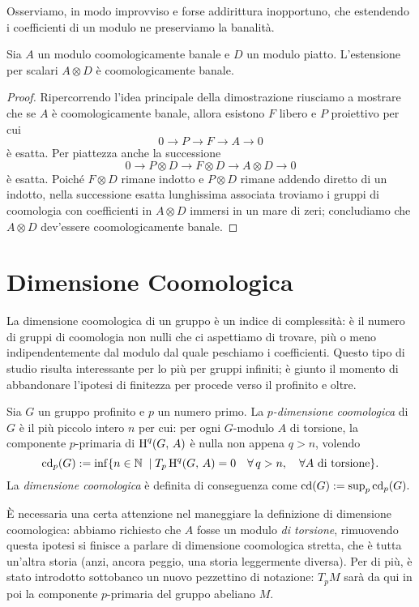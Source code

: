 Osserviamo, in modo improvviso e forse addirittura inopportuno, che estendendo i coefficienti di un modulo ne preserviamo la banalità.

\begin{corollary}\label{tensor magic}
	Sia $ A $ un modulo coomologicamente banale e $ D $ un modulo piatto. L'estensione per scalari $ A \otimes D $ è coomologicamente banale.
\end{corollary}
\begin{proof}
	Ripercorrendo l'idea principale della dimostrazione riusciamo a mostrare che se $ A $ è coomologicamente banale, allora esistono $ F $ libero e $ P $ proiettivo per cui
	\[ 0 \to P \to F \to A \to 0 \]
	è esatta. Per piattezza anche la successione
	\[ 0 \to P \otimes D \to F\otimes D \to A\otimes D \to 0 \]
	è esatta. Poiché $ F \otimes D $ rimane indotto e $ P \otimes D $ rimane addendo diretto di un indotto, nella successione esatta lunghissima associata troviamo i gruppi di coomologia con coefficienti in $ A \otimes D $ immersi in un mare di zeri; concludiamo che $ A \otimes D $ dev'essere coomologicamente banale.
\end{proof}

\section{Dimensione Coomologica}
La dimensione coomologica di un gruppo è un indice di complessità: è il numero di gruppi di coomologia non nulli che ci aspettiamo di trovare, più o meno indipendentemente dal modulo dal quale peschiamo i coefficienti. Questo tipo di studio risulta interessante per lo più per gruppi infiniti; è giunto il momento di abbandonare l'ipotesi di finitezza per procede verso il profinito e oltre.

\begin{definition}
	Sia $ G $ un gruppo profinito e $ p $ un numero primo. La \emph{$ p $-dimensione coomologica} di $ G $ è il più piccolo intero $ n $ per cui: per ogni $ G $-modulo $ A $ di torsione, la componente $ p $-primaria di $ \operatorname{H}^q(G, \, A) $ è nulla non appena $ q > n $, volendo
	\[ \operatorname{cd}_p(G) := \inf \{ n \in \mathbb{N} \; \mid T_p\operatorname{H}^q(G, \, A)=0\quad \forall \, q > n, \quad \forall A \text{ di torsione} \}. \]
	La \emph{dimensione coomologica} è definita di conseguenza come $ \operatorname{cd}(G) := \sup_p \operatorname{cd}_p(G). $
\end{definition}

È necessaria una certa attenzione nel maneggiare la definizione di dimensione coomologica: abbiamo richiesto che $ A $ fosse un modulo \emph{di torsione}, rimuovendo questa ipotesi si finisce a parlare di dimensione coomologica stretta, che è tutta un'altra storia (anzi, ancora peggio, una storia leggermente diversa). Per di più, è stato introdotto sottobanco un nuovo pezzettino di notazione: $ T_p M $ sarà da qui in poi la componente $ p $-primaria del gruppo abeliano $ M $. \\

